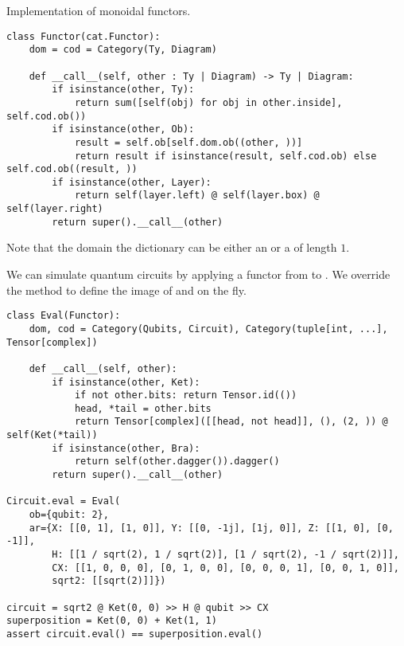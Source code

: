 \begin{python}
{\normalfont Implementation of monoidal functors.}
\begin{verbatim}
class Functor(cat.Functor):
    dom = cod = Category(Ty, Diagram)

    def __call__(self, other : Ty | Diagram) -> Ty | Diagram:
        if isinstance(other, Ty):
            return sum([self(obj) for obj in other.inside], self.cod.ob())
        if isinstance(other, Ob):
            result = self.ob[self.dom.ob((other, ))]
            return result if isinstance(result, self.cod.ob) else self.cod.ob((result, ))
        if isinstance(other, Layer):
            return self(layer.left) @ self(layer.box) @ self(layer.right)
        return super().__call__(other)
\end{verbatim}

Note that the domain the dictionary  can be either an  or a  of length $1$.
\end{python}

\begin{example}
We can simulate quantum circuits by applying a functor from  to .
We override the  method to define the image of  and  on the fly.

\begin{verbatim}
class Eval(Functor):
    dom, cod = Category(Qubits, Circuit), Category(tuple[int, ...], Tensor[complex])

    def __call__(self, other):
        if isinstance(other, Ket):
            if not other.bits: return Tensor.id(())
            head, *tail = other.bits
            return Tensor[complex]([[head, not head]], (), (2, )) @ self(Ket(*tail))
        if isinstance(other, Bra):
            return self(other.dagger()).dagger()
        return super().__call__(other)

Circuit.eval = Eval(
    ob={qubit: 2},
    ar={X: [[0, 1], [1, 0]], Y: [[0, -1j], [1j, 0]], Z: [[1, 0], [0, -1]],
        H: [[1 / sqrt(2), 1 / sqrt(2)], [1 / sqrt(2), -1 / sqrt(2)]],
        CX: [[1, 0, 0, 0], [0, 1, 0, 0], [0, 0, 0, 1], [0, 0, 1, 0]],
        sqrt2: [[sqrt(2)]]})

circuit = sqrt2 @ Ket(0, 0) >> H @ qubit >> CX
superposition = Ket(0, 0) + Ket(1, 1)
assert circuit.eval() == superposition.eval()
\end{verbatim}
\end{example}

